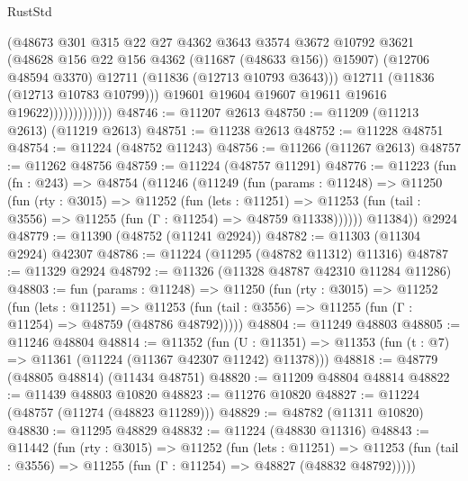 \begin{lexlean}{RustStd}
\begin{coremodule}
                                (@48673
                                  @301
                                  @315
                                  @22
                                  @27
                                  @4362
                                  @3643
                                  @3574
                                  @3672
                                  @10792
                                  @3621
                                  (@48628 @156 @22 @156 @4362 (@11687 (@48633 @156)) @15907)
                                  (@12706 @48594 @3370)
                                  @12711
                                  (@11836 (@12713 @10793 @3643)))
                                @12711
                                (@11836 (@12713 @10783 @10799)))
                              @19601
                              @19604
                              @19607
                              @19611
                              @19616
                              @19622)))))))))))))
@48746 := @11207 @2613
@48750 := @11209 (@11213 @2613) (@11219 @2613)
@48751 := @11238 @2613
@48752 := @11228 @48751
@48754 := @11224 (@48752 @11243)
@48756 := @11266 (@11267 @2613)
@48757 := @11262 @48756
@48759 := @11224 (@48757 @11291)
@48776 := @11223
    (fun (fn : @243) =>
    @48754
      (@11246
        (@11249
          (fun (params : @11248) =>
          @11250
            (fun (rty : @3015) =>
            @11252
              (fun (lets : @11251) =>
              @11253 (fun (tail : @3556) => @11255 (fun (Γ : @11254) => @48759 @11338))))))
        @11384))
    @2924
@48779 := @11390 (@48752 (@11241 @2924))
@48782 := @11303 (@11304 @2924) @42307
@48786 := @11224 (@11295 (@48782 @11312) @11316)
@48787 := @11329 @2924
@48792 := @11326 (@11328 @48787 @42310 @11284 @11286)
@48803 := fun (params : @11248) =>
  @11250
    (fun (rty : @3015) =>
    @11252
      (fun (lets : @11251) =>
      @11253 (fun (tail : @3556) => @11255 (fun (Γ : @11254) => @48759 (@48786 @48792)))))
@48804 := @11249 @48803
@48805 := @11246 @48804
@48814 := @11352
    (fun (U : @11351) => @11353 (fun (t : @7) => @11361 (@11224 (@11367 @42307 @11242) @11378)))
@48818 := @48779 (@48805 @48814) (@11434 @48751)
@48820 := @11209 @48804 @48814
@48822 := @11439 @48803 @10820
@48823 := @11276 @10820
@48827 := @11224 (@48757 (@11274 (@48823 @11289)))
@48829 := @48782 (@11311 @10820)
@48830 := @11295 @48829
@48832 := @11224 (@48830 @11316)
@48843 := @11442
    (fun (rty : @3015) =>
    @11252
      (fun (lets : @11251) =>
      @11253 (fun (tail : @3556) => @11255 (fun (Γ : @11254) => @48827 (@48832 @48792)))))

\end{coremodule}
\end{lexlean}
